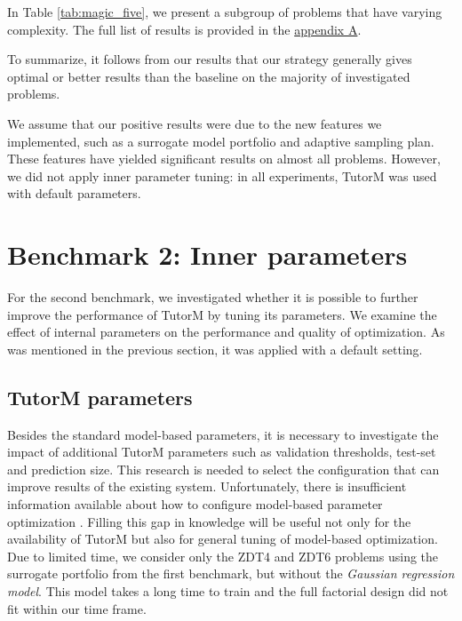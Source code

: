     In Table \ref{tab:magic_five}, we present a subgroup of problems that have varying complexity. The full list of results is provided in the  \hyperref[sec:appendix-a]{appendix A}.

    

    To summarize, it follows from our results that our strategy generally gives optimal or better results than the baseline on the majority of investigated problems.
    

    We assume that our positive results were due to the new features we implemented, such as a surrogate model portfolio and adaptive sampling plan. These features have yielded significant results on almost all problems. However, we did not apply inner parameter tuning: in all experiments, TutorM was used with default parameters.

\section{Benchmark 2: Inner parameters } \label{sec:bench2}
    For the second benchmark, we investigated whether it is possible to further improve the performance of TutorM by tuning its parameters. We examine the effect of internal parameters on the performance and quality of optimization. As was mentioned in the previous section, it was applied with a default setting.

    \subsection{TutorM parameters}
    Besides the standard model-based parameters, it is necessary to investigate the impact of additional TutorM parameters such as validation thresholds, test-set and prediction size. This research is needed to select the configuration that can improve results of the existing system. Unfortunately, there is insufficient information available about how to configure model-based parameter optimization \cite{TobiasCV, HybridSurrRCG}. Filling this gap in knowledge will be useful not only for the availability of TutorM but also for general tuning of model-based optimization.  
    Due to limited time, we consider only the ZDT4 and ZDT6 problems using the surrogate portfolio from the first benchmark, but without the \emph{Gaussian regression model}. This model takes a long time to train and the full factorial design did not fit within our time frame.

